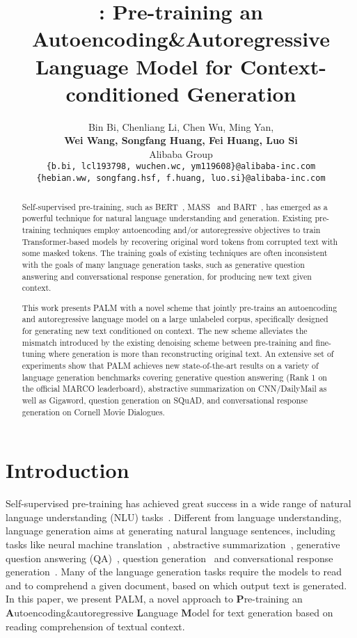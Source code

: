 \documentclass[11pt,a4paper]{article}
\title{\method: Pre-training an Autoencoding\&Autoregressive Language Model for Context-conditioned Generation}
\author{Bin Bi, Chenliang Li, Chen Wu, Ming Yan, \\
\textbf{Wei Wang, Songfang Huang, Fei Huang, Luo Si} \\
  Alibaba Group \\
  {\tt \{b.bi, lcl193798, wuchen.wc, ym119608\}@alibaba-inc.com} \\
  {\tt \{hebian.ww, songfang.hsf, f.huang, luo.si\}@alibaba-inc.com}}
\date{}
\newcommand{\method}{PALM\xspace}
\begin{document}
\maketitle
\begin{abstract}
Self-supervised pre-training, such as BERT~\cite{bert2018jacob}, MASS~\cite{mass2019song} and BART~\cite{bart2019}, has emerged as a powerful technique for natural language understanding and generation. Existing pre-training techniques employ autoencoding and/or autoregressive objectives to train Transformer-based models by recovering original word tokens from corrupted text with some masked tokens. The training goals of existing techniques are often inconsistent with the goals of many language generation tasks, such as generative question answering and conversational response generation, for producing new text given context.

This work presents \method with a novel scheme that jointly pre-trains an autoencoding and autoregressive language model on a large unlabeled corpus, specifically designed for generating new text conditioned on context. The new scheme alleviates the mismatch introduced by the existing denoising scheme between pre-training and fine-tuning where generation is more than reconstructing original text. An extensive set of experiments show that \method achieves new state-of-the-art results on a variety of language generation benchmarks covering generative question answering (Rank 1 on the official MARCO leaderboard), abstractive summarization on CNN/DailyMail as well as Gigaword, question generation on SQuAD, and conversational response generation on Cornell Movie Dialogues.

\end{abstract}

\section{Introduction}
Self-supervised pre-training has achieved great success in a wide range of natural language understanding (NLU) tasks~\cite{semi2015dai,howard-ruder-2018-universal,Radford2018ImprovingLU,peters-etal-2018-deep,bert2018jacob}. Different from language understanding, language generation aims at generating natural language sentences, including tasks like neural machine translation~\cite{Bahdanau:2015,Vaswani17attention}, abstractive summarization~\cite{rush-etal-2015-neural,See:17,Gehrmann:18}, generative question answering (QA)~\cite{Tan:17,bi2019incorporating}, question generation~\cite{zhao-etal-2018-paragraph} and conversational response generation~\cite{Vinyals:2015}. Many of the language generation tasks require the models to read and to comprehend a given document, based on which output text is generated. In this paper, we present \method, a novel approach to \textbf{P}re-training an \textbf{A}utoencoding\&autoregressive \textbf{L}anguage \textbf{M}odel for text generation based on reading comprehension of textual context.
\end{document}
